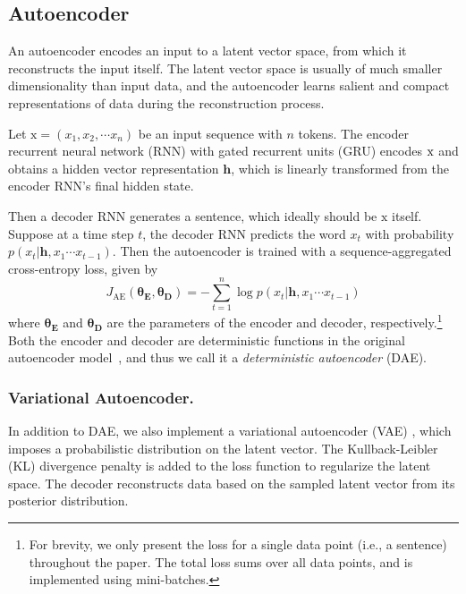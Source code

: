 \documentclass[letterpaper]{article} %
\newcommand{\rmx}{\mathrm x}
\newcommand{\loss}[1]{J_{\text{#1}}}
\newcommand{\nnweight}[1]{\bm{\theta_{\text{#1}}}}
\begin{document}
\subsection{Autoencoder} \label{ssec:seq2seq-autoencoder}

An autoencoder encodes an input to a latent vector space, from which it reconstructs the input itself.
The latent vector space is usually of much smaller dimensionality than input data, and the autoencoder learns salient and compact representations of data during the reconstruction process.

Let $\rmx=(x_1, x_2, \cdots x_n)$ be an input sequence with $n$ tokens.
The encoder recurrent neural network (RNN) with gated recurrent units (GRU) \cite{cho2014learning} encodes $\rm x$ and obtains a hidden vector representation $\bm h$, which is linearly transformed from the encoder RNN's final hidden state.

Then a decoder RNN generates a sentence, which ideally should be $\rmx$ itself.
Suppose at a time step $t$, the decoder RNN predicts the word $x_t$ with probability $p(x_t|\bm h, x_1\cdots x_{t-1})$. Then the autoencoder is trained with a sequence-aggregated cross-entropy loss, given by
\begin{equation}\label{eqn:ae}
	\loss{AE}(\nnweight{E},\nnweight{D})= -\sum_{t=1}^n \log p(x_t|\bm h, x_1\cdots x_{t-1})
\end{equation}
where $\nnweight{E}$ and $\nnweight{D}$ are the parameters of the encoder and decoder, respectively.\footnote{For brevity, we only present the loss for a single data point (i.e., a sentence) throughout the paper. The total loss sums over all data points, and is implemented using mini-batches.} Both the encoder and decoder are deterministic functions in the original autoencoder model~\cite{rumelhart1985learning}, and thus we call it a \textit{deterministic autoencoder} (DAE).


\subsubsection{Variational Autoencoder.}

In addition to DAE, we also implement a variational autoencoder (VAE) \cite{kingma2013auto}, which imposes a probabilistic distribution on the latent vector. The Kullback-Leibler (KL) divergence \cite{kullback1951information} penalty is added to the loss function to regularize the latent space. The decoder reconstructs data based on the sampled latent vector from its posterior distribution.
\end{document}
